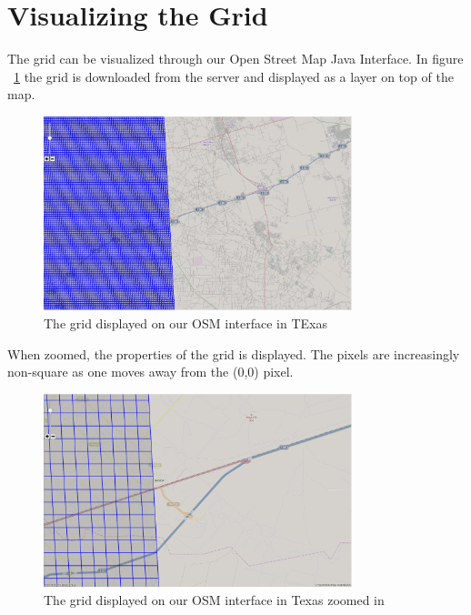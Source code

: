 \section{Visualizing the Grid}
The grid can be visualized through our Open Street Map Java Interface. In figure ~\ref{fig:texasGrid} the grid is downloaded from the server and displayed as a layer on top of the map.

\begin{figure}[t]
\begin{center}
\includegraphics[width=0.8\textwidth]{./Figures/texasGrid.png}
\caption{The grid displayed on our OSM interface in TExas}
\label{fig:texasGrid}
\end{center}
\end{figure}

When zoomed, the properties of the grid is displayed. The pixels are increasingly non-square as one moves away from the (0,0) pixel.

\begin{figure}[t]
\begin{center}
\includegraphics[width=0.8\textwidth]{./Figures/texasGridZoom.png}
\caption{The grid displayed on our OSM interface in Texas zoomed in}
\label{fig:texasGridZoom}
\end{center}
\end{figure}







